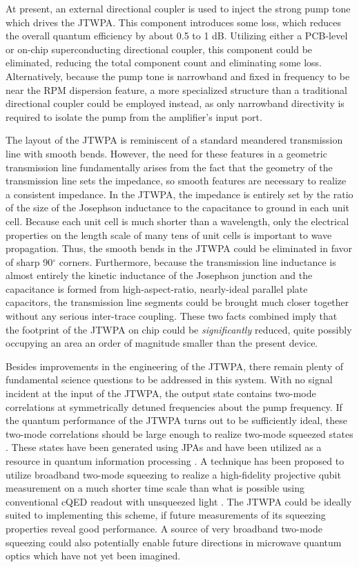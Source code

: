 At present, an external directional coupler is used to inject the strong pump tone which drives the JTWPA.  This component introduces some loss, which reduces the overall quantum efficiency by about 0.5 to 1 dB.  Utilizing either a PCB-level or on-chip superconducting directional coupler, this component could be eliminated, reducing the total component count and eliminating some loss.  Alternatively, because the pump tone is narrowband and fixed in frequency to be near the RPM dispersion feature, a more specialized structure than a traditional directional coupler could be employed instead, as only narrowband directivity is required to isolate the pump from the amplifier's input port.

The layout of the JTWPA is reminiscent of a standard meandered transmission line with smooth bends.  However, the need for these features in a geometric transmission line fundamentally arises from the fact that the geometry of the transmission line sets the impedance, so smooth features are necessary to realize a consistent impedance.  In the JTWPA, the impedance is entirely set by the ratio of the size of the Josephson inductance to the capacitance to ground in each unit cell.  Because each unit cell is much shorter than a wavelength, only the electrical properties on the length scale of many tens of unit cells is important to wave propagation.  Thus, the smooth bends in the JTWPA could be eliminated in favor of sharp 90$^\circ$ corners.  Furthermore, because the transmission line inductance is almost entirely the kinetic inductance of the Josephson junction and the capacitance is formed from high-aspect-ratio, nearly-ideal parallel plate capacitors, the transmission line segments could be brought much closer together without any serious inter-trace coupling.  These two facts combined imply that the footprint of the JTWPA on chip could be \textit{significantly} reduced, quite possibly occupying an area an order of magnitude smaller than the present device.

Besides improvements in the engineering of the JTWPA, there remain plenty of fundamental science questions to be addressed in this system.  With no signal incident at the input of the JTWPA, the output state contains two-mode correlations at symmetrically detuned frequencies about the pump frequency.  If the quantum performance of the JTWPA turns out to be sufficiently ideal, these two-mode correlations should be large enough to realize two-mode squeezed states \cite{Loudon1987}.  These states have been generated using JPAs \cite{Eichler2011,PhysRevLett.108.123902} and have been utilized as a resource in quantum information processing \cite{PhysRevLett.114.090503}.  A technique has been proposed to utilize broadband two-mode squeezing to realize a high-fidelity projective qubit measurement on a much shorter time scale than what is possible using conventional cQED readout with unsqueezed light \cite{Didier2015}.  The JTWPA could be ideally suited to implementing this scheme, if future measurements of its squeezing properties reveal good performance.  A source of very broadband two-mode squeezing could also potentially enable future directions in microwave quantum optics which have not yet been imagined.



